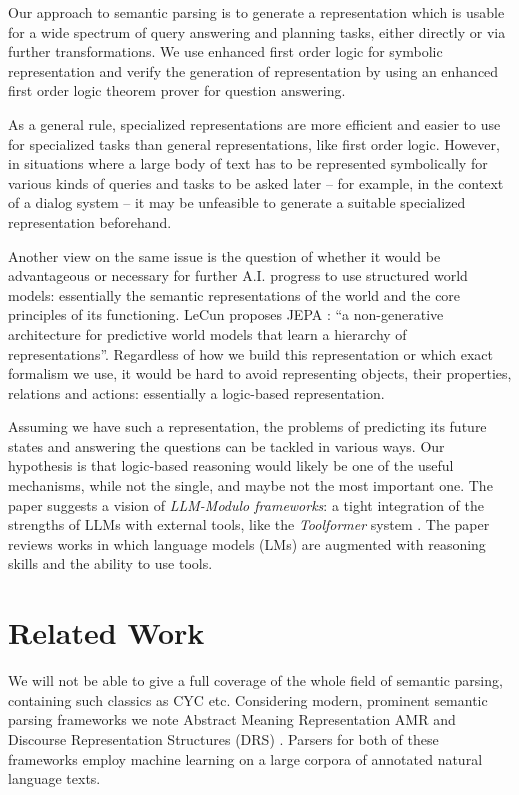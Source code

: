 \documentclass[runningheads]{llncs}
\begin{document}
Our approach to semantic parsing is to generate a representation which is 
usable for a wide spectrum of query answering and planning tasks, either
directly or via further transformations. We use enhanced first order logic
for symbolic representation and verify the generation of representation 
by using an enhanced first order logic theorem prover for question answering.

As a general rule, specialized representations are more efficient and easier
to use for specialized tasks than general representations, like first order logic. 
However, in situations where a large body of text has to be represented
symbolically for various kinds of queries and tasks to be asked later -- for
example, in the context of a dialog system -- it may be unfeasible to generate
a suitable specialized representation beforehand.

Another view on the same issue is the question of whether it would be advantageous
or necessary for further A.I. progress to use structured world models: essentially
the semantic representations of the world and the core principles of its functioning.
LeCun proposes JEPA \cite{lecun2022path}: ``a non-generative architecture for predictive world 
models that learn a hierarchy of representations''. 
Regardless of how we build this representation or which exact formalism we use,
it would be hard to avoid representing objects, their properties, relations and actions: 
essentially a logic-based representation. 

Assuming we have such a representation,
the problems of predicting its future states and answering the questions can be
tackled in various ways. Our hypothesis is that logic-based reasoning would likely
be one of the useful mechanisms, while not the single, and maybe not the most
important one. The paper \cite{kambhampati2024llms} suggests a vision of 
{\em LLM-Modulo frameworks}: a tight integration of the strengths of LLMs with external tools,
like the {\em Toolformer} system \cite{schick2024toolformer}. The paper
\cite{ref_lecun_2023} reviews works in which language models (LMs) are augmented with reasoning
skills and the ability to use tools.


\section{Related Work}

We will not be able to give a full coverage of the whole field of semantic
parsing, containing such classics as CYC \cite{ref_cyc} etc. 
Considering modern, prominent semantic parsing frameworks we note 
Abstract Meaning Representation AMR \cite{banarescu2013abstract}
and Discourse Representation Structures (DRS) \cite{liu2018discourse}.
Parsers for both of these frameworks employ machine learning on a large corpora
of annotated natural language texts.
\end{document}
